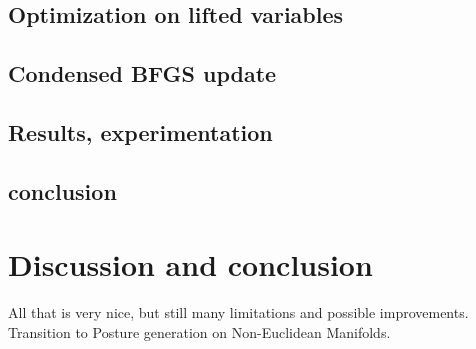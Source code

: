 \subsection{Optimization on lifted variables}
\label{subsec:optimization_on_lifted_variables}

\subsection{Condensed BFGS update}
\label{subsec:condensed_bfgs_update}

\subsection{Results, experimentation}
\label{subsec:Results}

\subsection{conclusion}
\label{subsec:conclusion}


\section{Discussion and conclusion}


All that is very nice, but still many limitations and possible improvements.
Transition to Posture generation on Non-Euclidean Manifolds.



